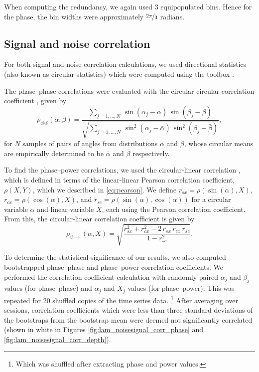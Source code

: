 When computing the redundancy, we again used \num{3} equipopulated bins.
Hence for the phase, the bin widths were approximately $\nicefrac{2\pi}{3}$ radians.


\subsection{Signal and noise correlation}
\label{sec:pl_phase_correlation}

For both signal and noise correlation calculations, we used directional statistics (also known as circular statistics) which were computed using the  toolbox \citep{Berens2009}.

The phase--phase correlations were evaluated with the circular-circular correlation coefficient \citep[page~176]{Jammalamadaka2001}, given by
\begin{equation}
\rho_{\circlearrowleft \circlearrowleft}(\alpha, \beta) = \frac{
\sum_{j = 1, \ldots, N} \, \sin(\alpha_j - \bar{\alpha}) \, \sin(\beta_j - \bar{\beta})
}{
\sqrt{\sum_{j = 1, \ldots, N} \, \sin^2(\alpha_j - \bar{\alpha}) \, \sin^2(\beta_j - \bar{\beta})}
},
\end{equation}
for $N$ samples of pairs of angles from distributions $\alpha$ and $\beta$, whose circular means are empirically determined to be $\bar\alpha$ and $\bar\beta$ respectively.

To find the phase--power correlations, we used the circular-linear correlation \citep[Equation~27.47]{Zar1998}, which is defined in terms of the linear-linear Pearson correlation coefficient, $\rho(X,Y)$, which we described in \autoref{eq:pearson}.
We define
$r_{sx} = \rho(\sin(\alpha), X)$,
$r_{cx} = \rho(\cos(\alpha), X)$, and
$r_{sc} = \rho(\sin(\alpha), \cos(\alpha))$
for a circular variable $\alpha$ and linear variable $X$, each using the Pearson correlation coefficient.
From this, the circular-linear correlation coefficient is given by
\begin{equation}
\rho_{\circlearrowleft \rightarrow}(\alpha, X) = \sqrt{
\frac{
r_{sx}^2 + r_{cx}^2 - 2 \, r_{sx} \, r_{cx} \, r_{sc}
}{
1 - r_{sc}^2
}
}.
\end{equation}

To determine the statistical significance of our results, we also computed bootstrapped phase--phase and phase--power correlation coefficients.
We performed the correlation coefficient calculation with randomly paired $\alpha_j$ and $\beta_j$ values (for phase--phase) and $\alpha_j$ and $X_j$ values (for phase--power).
This was repeated for \num{20} shuffled copies of the time series data.%
\footnote{Which was shuffled after extracting phase and power values.}
After averaging over sessions, correlation coefficients which were less than three standard deviations of the bootstraps from the bootstrap mean were deemed not significantly correlated (shown in white in Figures \ref{fig:lam_noisesignal_corr_phase} and \ref{fig:lam_noisesignal_corr_depth}).


